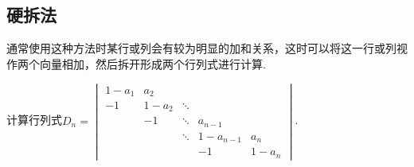 \subsection{硬拆法}

通常使用这种方法时某行或列会有较为明显的加和关系，这时可以将这一行或列视作两个向量相加，然后拆开形成两个行列式进行计算.

\begin{example}{}{}
    计算行列式$D_n=\begin{vmatrix}
            1-a_{1} & a_{2}   &        &           &         \\
            -1      & 1-a_{2} & \ddots &           &         \\
                    & -1      & \ddots & a_{n-1}   &         \\
                    &         & \ddots & 1-a_{n-1} & a_{n}   \\
                    &         &        & -1        & 1-a_{n}
        \end{vmatrix}$.
\end{example}

